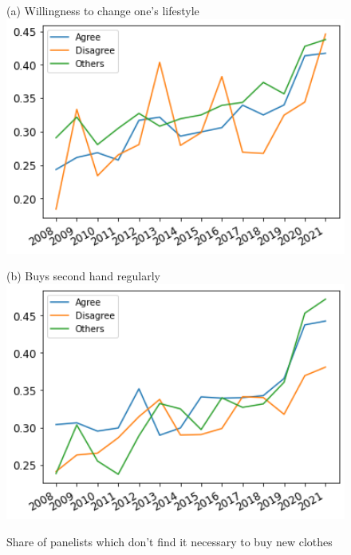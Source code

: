 \documentclass[12pt]{article}
\begin{document}
\begin{figure}[h!!]
	\centering	
	\caption{{Share of panelists which don't find it necessary to buy new clothes }}\label{fig:evolution_notNecessary_bygroup:clothes}	
\begin{minipage}[h!!]{0.32\textwidth}
	\centering\footnotesize{(a) Willingness to change one's lifestyle}
	\includegraphics[width=1\textwidth]{../codding_data/results/liss/broad_groups_notnecessaryqk20a175_ci306.png}
\end{minipage}
	\begin{minipage}[h!!]{0.32\textwidth}
		\centering\footnotesize{(b) Buys second hand regularly}
		\includegraphics[width=1\textwidth]{../codding_data/results/liss/broad_groups_notnecessaryqk20a135_ci306.png}
	\end{minipage}

\end{figure}
\end{document}
